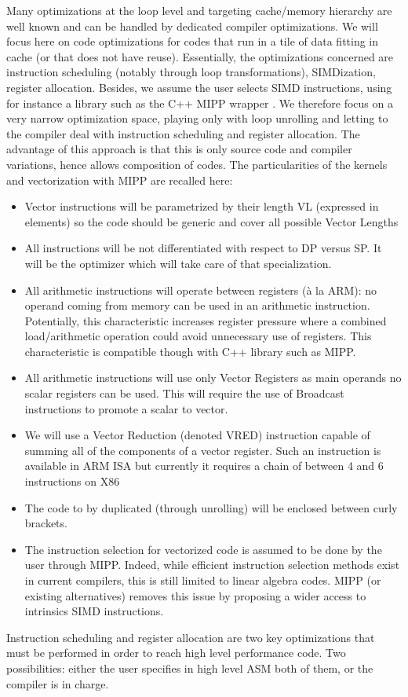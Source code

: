 \documentclass[sigconf,review]{acmart}
\begin{document}
Many optimizations at the loop level and targeting cache/memory
hierarchy are well known and can be handled by dedicated compiler
optimizations. We will focus here on code optimizations for codes that
run in a tile of data fitting in cache (or that does not have
reuse). Essentially, the optimizations concerned are instruction
scheduling (notably through loop transformations), SIMDization,
register allocation. Besides, we assume the user selects SIMD
instructions, using for instance a library such as the C++ MIPP
wrapper \cite{mipp}. We therefore focus on a very narrow optimization
space, playing only with loop unrolling and letting to the compiler
deal with instruction scheduling and register allocation.  The
advantage of this approach is that this is only source code and
compiler variations, hence allows composition of codes.  The
particularities of the kernels and vectorization with MIPP are
recalled here:
\begin{itemize}
  \item Vector instructions will be parametrized by their length VL (expressed in elements) so the code should be generic and cover all possible Vector Lengths
\item All instructions will be not differentiated with respect to DP versus SP. It will be the optimizer which will take care of that specialization.
\item All arithmetic instructions will operate between registers (à la ARM): no operand coming from memory can be used in an arithmetic instruction. Potentially, this characteristic increases register pressure where a combined load/arithmetic operation could avoid unnecessary use of registers. This characteristic is compatible though with C++ library such as MIPP. 
\item All arithmetic instructions will use only Vector Registers as main operands no scalar registers can be used. This will require the use of Broadcast instructions to promote a scalar to vector.
\item We will use a Vector Reduction (denoted VRED) instruction capable of summing all of the components of a vector register. Such an instruction is available in ARM ISA but currently it requires a chain of between 4 and 6 instructions on X86
\item The code to by duplicated (through unrolling) will be enclosed between curly brackets. 
\item The instruction selection for vectorized code is assumed to be done by the user through MIPP. Indeed, while efficient instruction selection methods exist in current compilers, this is still limited to linear algebra codes. MIPP (or existing alternatives) removes this issue by proposing a wider access to intrinsics SIMD instructions.
\end{itemize}
Instruction scheduling and register allocation are two key optimizations that must be performed in order to reach high level performance code. Two possibilities: either the user specifies in high level ASM both of them, or the compiler is in charge. 
\end{document}
